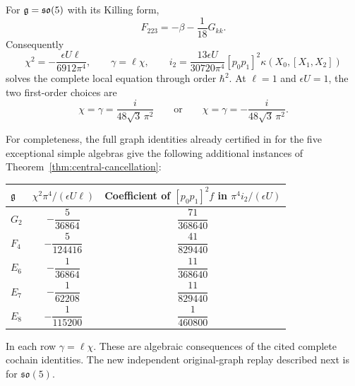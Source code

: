 \begin{corollary}
\label{cor:so5-central}
For $\mathfrak g=\mathfrak{so}(5)$ with its Killing form,
\begin{equation}
 F_{223}=-\beta-\frac1{18}G_{kk}.
\end{equation}
Consequently
\begin{equation}
 \chi^2=-\frac{\epsilon U\ell}{6912\pi^4},\qquad
 \gamma=\ell\chi,\qquad
 i_2=\frac{13\epsilon U}{30720\pi^4}
          [p_0p_1]^2\kappa(X_0,[X_1,X_2])
 \label{eq:so5-central-solution}
\end{equation}
solves the complete local equation through order $\hbar^2$.
At $\ell=1$ and $\epsilon U=1$, the two first-order choices are
\begin{equation}
 \chi=\gamma=\frac{i}{48\sqrt3\,\pi^2}
 \qquad\text{or}\qquad
 \chi=\gamma=-\frac{i}{48\sqrt3\,\pi^2}.
\end{equation}
\end{corollary}

For completeness, the full graph identities already certified
in \cite{RepoOriginal} for the five exceptional simple algebras
give the following additional instances of
Theorem~\ref{thm:central-cancellation}:
\begin{center}
\renewcommand{\arraystretch}{1.6}
\begin{tabular}{@{}lcc@{}}
\toprule
$\mathfrak g$ & $\chi^2\pi^4/(\epsilon U\ell)$
 & Coefficient of $[p_0p_1]^2f$ in $\pi^4 i_2/(\epsilon U)$\\
\midrule
$G_2$ & $-\dfrac5{36864}$ & $\dfrac{71}{368640}$\\
\addlinespace[3pt]
$F_4$ & $-\dfrac5{124416}$ & $\dfrac{41}{829440}$\\
\addlinespace[3pt]
$E_6$ & $-\dfrac1{36864}$ & $\dfrac{11}{368640}$\\
\addlinespace[3pt]
$E_7$ & $-\dfrac1{62208}$ & $\dfrac{11}{829440}$\\
\addlinespace[3pt]
$E_8$ & $-\dfrac1{115200}$ & $\dfrac1{460800}$\\
\bottomrule
\end{tabular}
\end{center}
In each row $\gamma=\ell\chi$. These are algebraic consequences
of the cited complete cochain identities. The new independent
original-graph replay described next is for $\mathfrak{so}(5)$.

